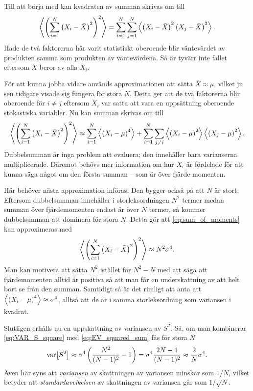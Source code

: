 Till att börja med kan kvadraten av summan skrivas om till
\begin{equation}
\ev{\left(\sum_{i=1}^N\left(X_i-\bar{X}\right)^2 \right)^2} 
= \sum_{i=1}^N \sum_{j=1}^N
\ev{ \left(X_i-\bar{X}\right)^2\left(X_j-\bar{X}\right)^2 }.
\end{equation}
Hade de två faktorerna här varit statistiskt oberoende blir väntevärdet av produkten samma som produkten av väntevärdena\cite{Rice_matstat2006}. Så är tyvärr inte fallet eftersom $\bar{X}$ beror av alla $X_i$.

För att kunna jobba vidare används approximationen att sätta $\bar{X}\approx \mu$, vilket ju sen tidigare visade sig fungera för stora $N$. Detta ger att de två faktorerna blir oberoende för $i\neq j$ eftersom $X_i$ var satta att vara en uppsättning oberoende stokastiska variabler. Nu kan summan skrivas om till
\begin{equation}\label{eq:sum_of_moments}
\ev{\left(\sum_{i=1}^N\left(X_i-\bar{X}\right)^2 \right)^2} 
\approx
\sum_{i=1}^N \ev{\left(X_i-\mu \right)^4} 
+\sum_{i=1}^N\sum_{j\neq i} 
\ev{\left(X_i-\mu \right)^2}\ev{\left(X_j-\mu \right)^2}.
\end{equation}
Dubbelsumman är inga problem att evaluera; den innehåller bara varianserna multiplicerade. Däremot behövs mer information om hur $X_i$ är fördelade för att kunna säga något om den första summan -- som är över fjärde momenten.

Här behöver nästa approximation införas. Den bygger också på att $N$ är stort. Eftersom dubbelsumman innehåller i storleksordningen $N^2$ termer medan summan över fjärdemomenten endast är över $N$ termer, så kommer dubbelsumman att dominera för stora $N$. Detta gör att \eqref{eq:sum_of_moments} kan approximeras med
\begin{equation}\label{eq:EV_squared_sum}
\ev{\left(\sum_{i=1}^N\left(X_i-\bar{X}\right)^2 \right)^2} 
\approx
N^2\sigma^4.
\end{equation}
Man kan motivera att sätta $N^2$ istället för $N^2-N$ med att säga att fjärdemomenten alltid är positiva så att man får en underskattning av att helt bort se från den summan. Samtidigt så är det rimligt att anta att $\ev{\left(X_i-\mu\right)^4}\approx\sigma^4$, alltså att de är i samma storleksordning som variansen i kvadrat. 

Slutligen erhålls nu en uppskattning av variansen av $S^2$. Så, om man kombinerar \eqref{eq:VAR_S_square} med \eqref{eq:EV_squared_sum} fås för stora $N$ 
\begin{equation}
\text{var}\!\left[S^2\right] 
\approx \sigma^4\left(\frac{N^2}{(N-1)^2} -1 \right) 
=\sigma^4\frac{2N-1}{(N-1)^2}
\approx \frac{2}{N}\sigma^4.
\end{equation}
Även här syns att \emph{variansen} av skattningen av variansen minskar som $1/N$, vilket betyder att \emph{standardavvikelsen} av skattningen av variansen går som $1/\sqrt{N}$. 


